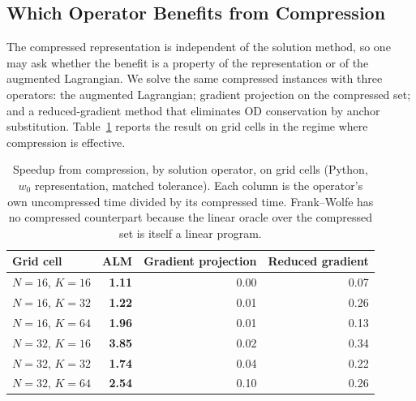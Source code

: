 \documentclass[11pt]{article}
\begin{document}
\subsection{Which Operator Benefits from Compression}
\label{sec:operator-study}


The compressed representation is independent of the solution method, so one may ask whether
the benefit is a property of the representation or of the augmented Lagrangian. We solve the
same compressed instances with three operators: the augmented Lagrangian; gradient projection
on the compressed set; and a reduced-gradient method that eliminates OD conservation by
anchor substitution. Table~\ref{tab:operator-compression} reports the result on grid cells in
the regime where compression is effective.

\begin{table}[h]
\centering
\caption{Speedup from compression, by solution operator, on grid cells
(Python, $w_0$ representation, matched tolerance). Each column is the operator's own
uncompressed time divided by its compressed time. Frank--Wolfe has no compressed counterpart
because the linear oracle over the compressed set is itself a linear program.}
\label{tab:operator-compression}
{\small
\begin{tabular}{lrrr}
\toprule
Grid cell & ALM & Gradient projection & Reduced gradient\\
\midrule
$N=16$, $K=16$ & \textbf{1.11} & 0.00 & 0.07\\
$N=16$, $K=32$ & \textbf{1.22} & 0.01 & 0.26\\
$N=16$, $K=64$ & \textbf{1.96} & 0.01 & 0.13\\
$N=32$, $K=16$ & \textbf{3.85} & 0.02 & 0.34\\
$N=32$, $K=32$ & \textbf{1.74} & 0.04 & 0.22\\
$N=32$, $K=64$ & \textbf{2.54} & 0.10 & 0.26\\
\bottomrule
\end{tabular}}
\end{table}
\end{document}
